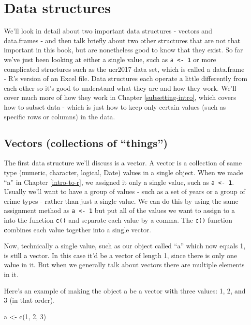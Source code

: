 \documentclass[
  a4paper,
]{krantz}
\makeatletter
\newenvironment{Shaded}{\begin{snugshade}}{\end{snugshade}}
\newcommand{\DecValTok}[1]{\textcolor[rgb]{0.06,0.06,0.06}{#1}}
\newcommand{\FunctionTok}[1]{\textcolor[rgb]{0,0,0}{#1}}
\newcommand{\NormalTok}[1]{#1}
\newcommand{\OtherTok}[1]{\textcolor[rgb]{0.37,0.37,0.37}{#1}}
\newenvironment{kframe}{%
\medskip{}
\setlength{\fboxsep}{.8em}
 \def\at@end@of@kframe{}%
 \ifinner\ifhmode%
  \def\at@end@of@kframe{\end{minipage}}%
  \begin{minipage}{\columnwidth}%
 \fi\fi%
 \def\FrameCommand##1{\hskip\@totalleftmargin \hskip-\fboxsep
 \colorbox{shadecolor}{##1}\hskip-\fboxsep
     \hskip-\linewidth \hskip-\@totalleftmargin \hskip\columnwidth}%
 \MakeFramed {\advance\hsize-\width
   \@totalleftmargin\z@ \linewidth\hsize
   \@setminipage}}%
 {\par\unskip\endMakeFramed%
 \at@end@of@kframe}
\renewenvironment{Shaded}{\begin{kframe}}{\end{kframe}}
\makeatother
\begin{document}
\hypertarget{data-structures}{%
\section{Data structures}\label{data-structures}}

We'll look in detail about two important data structures -
vectors and data.frames - and then talk briefly about two
other structures that are not that important in this book,
but are nonetheless good to know that they exist. So far
we've just been looking at either a single value, such as
\texttt{a\ \textless{}-\ 1} or more complicated structures
such as the ucr2017 data set, which is called a data.frame -
R's version of an Excel file. Data structures each operate a
little differently from each other so it's good to
understand what they are and how they work. We'll cover much
more of how they work in Chapter \ref{subsetting-intro},
which covers how to subset data - which is just how to keep
only certain values (such as specific rows or columns) in
the data.

\hypertarget{vectors}{%
\subsection{Vectors (collections of
``things'')}\label{vectors}}

The first data structure we'll discuss is a vector. A vector
is a collection of same type (numeric, character, logical,
Date) values in a single object. When we made ``a'' in
Chapter \ref{intro-to-r}, we assigned it only a single
value, such as \texttt{a\ \textless{}-\ 1}. Usually we'll
want to have a group of values - such as a set of years or a
group of crime types - rather than just a single value. We
can do this by using the same assignment method as
\texttt{a\ \textless{}-\ 1} but put all of the values we
want to assign to a into the function \texttt{c()} and
separate each value by a comma. The \texttt{c()} function
\textbf{c}ombines each value together into a single vector.

Now, technically a single value, such as our object called
``a'' which now equals 1, is still a vector. In this case
it'd be a vector of length 1, since there is only one value
in it. But when we generally talk about vectors there are
multiple elements in it.

Here's an example of making the object a be a vector with
three values: 1, 2, and 3 (in that order).

\begin{Shaded}
\begin{Highlighting}[]
\NormalTok{a }\OtherTok{\textless{}{-}} \FunctionTok{c}\NormalTok{(}\DecValTok{1}\NormalTok{, }\DecValTok{2}\NormalTok{, }\DecValTok{3}\NormalTok{)}
\end{Highlighting}
\end{Shaded}
\end{document}
